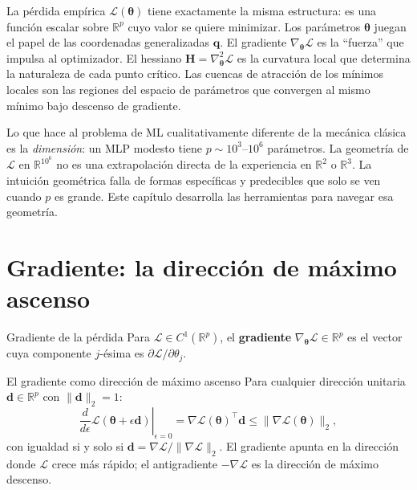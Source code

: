La pérdida empírica $\mathcal{L}(\bm{\theta})$ tiene exactamente la
misma estructura: es una función escalar sobre $\mathbb{R}^p$ cuyo
valor se quiere minimizar. Los parámetros $\bm{\theta}$ juegan el papel
de las coordenadas generalizadas $\bm{q}$. El gradiente
$\nabla_{\bm{\theta}}\mathcal{L}$ es la ``fuerza'' que impulsa al
optimizador. El hessiano
$\bm{H} = \nabla^2_{\bm{\theta}}\mathcal{L}$ es la curvatura local que
determina la naturaleza de cada punto crítico. Las cuencas de atracción
de los mínimos locales son las regiones del espacio de parámetros que
convergen al mismo mínimo bajo descenso de gradiente.

Lo que hace al problema de ML cualitativamente diferente de la mecánica
clásica es la \emph{dimensión}: un MLP modesto tiene
$p \sim 10^3$--$10^6$ parámetros. La geometría de $\mathcal{L}$ en
$\mathbb{R}^{10^6}$ no es una extrapolación directa de la experiencia
en $\mathbb{R}^2$ o $\mathbb{R}^3$. La intuición geométrica falla de
formas específicas y predecibles que solo se ven cuando $p$ es grande.
Este capítulo desarrolla las herramientas para navegar esa geometría.

\section{Gradiente: la dirección de máximo ascenso}
\label{sec:gradiente}


\begin{definicion}{Gradiente de la pérdida}
\label{def:gradiente}
Para $\mathcal{L} \in C^1(\mathbb{R}^p)$, el \textbf{gradiente}
$\nabla_{\bm{\theta}}\mathcal{L} \in \mathbb{R}^p$ es el vector cuya
componente $j$-ésima es $\partial\mathcal{L}/\partial\theta_j$.
\end{definicion}

\begin{proposicion}{El gradiente como dirección de máximo ascenso}
\label{prop:max_ascenso}
Para cualquier dirección unitaria $\bm{d} \in \mathbb{R}^p$ con
$\|\bm{d}\|_2 = 1$:
\begin{equation}
  \left.\frac{d}{d\epsilon}\mathcal{L}(\bm{\theta}+\epsilon\bm{d})
  \right|_{\epsilon=0}
  = \nabla\mathcal{L}(\bm{\theta})^\top\bm{d}
  \leq \|\nabla\mathcal{L}(\bm{\theta})\|_2,
  \label{eq:derivada_dir}
\end{equation}
con igualdad si y solo si
$\bm{d} = \nabla\mathcal{L}/\|\nabla\mathcal{L}\|_2$. El gradiente
apunta en la dirección donde $\mathcal{L}$ crece más rápido; el
antigradiente $-\nabla\mathcal{L}$ es la dirección de máximo descenso.
\end{proposicion}


